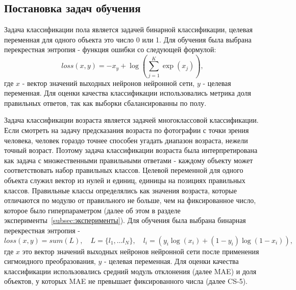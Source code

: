 \subsection{Постановка задач обучения}\label{subsec:постановка-задач-обучения}
Задача классификации пола является задачей бинарной классификации, целевая переменная для одного объекта это число 0 или 1.
Для обучения была выбрана перекрестная энтропия - функция ошибки со следующей формулой:
\[loss(x, y) = -x_y + \log\left(\sum\limits_{j=1}^{K}\exp(x_j)\right),\] где $x$ - вектор значений выходных нейронов нейронной сети,
$y$ - целевая переменная.
Для оценки качества классификации использовались метрика доля правильных ответов, так как выборки сбалансированны по полу.
\par Задача классификации возраста является задачей многоклассовой классификации.
Если смотреть на задачу предсказания возраста по фотографии с точки зрения человека,
человек гораздо точнее способен угадать диапазон возраста, нежели точный возраст.
Поэтому задача классификации возраста была интерпретирована как задача с множественными правильными ответами -
каждому объекту может соответствовать набор правильных классов.
Целевой переменной для одного объекта служил вектор из нулей и единиц, единицы на позициях правильных классов.
Правильные классы определялись как значения возраста, которые отличаются по модулю от правильного не больше,
чем на фиксированное число, которое было гиперпараметром (далее об этом в разделе эксперименты~\ref{subsec:эксперименты}).
Для обучения была выбрана бинарная перекрестная энтропия -
\[loss(x, y) = sum(L), \quad L = \{l_1, \dots l_N\}, \quad l_i = \left(y_i \log(x_i) + (1 - y_i) \log(1 - x_i)\right),\]
где $x$ это вектор значений выходных нейронов нейронной сети после применения сигмоидного преобразования,
$y$ - целевая переменная.
Для оценки качества классификации использовались средний модуль отклонения (далее MAE)
и доля объектов, у которых MAE не превышает фиксированного числа (далее CS-5).

